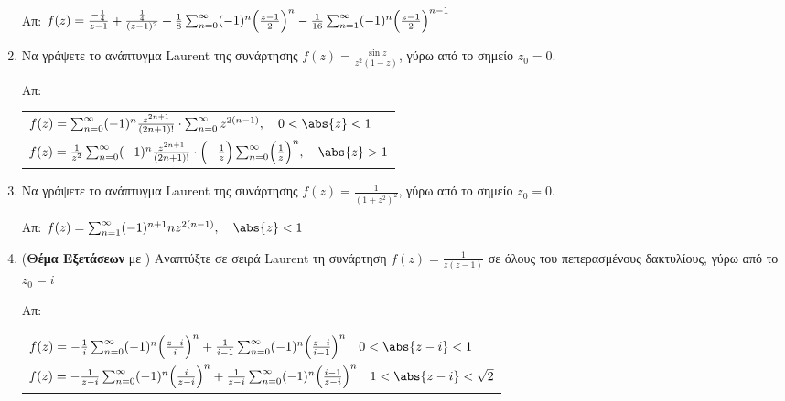 \begin{enumerate}
    \hfill Απ: $f(z)=\frac{-\frac{1}{4}}{z-1}+\frac{\frac{1}{4}}{(z-1)^2}+
    \frac{1}{8}\sum_{n=0}^{\infty}(-1)^n\Bigl(\frac{z-1}{2}\Bigr)^n-
    \frac{1}{16}\sum_{n=1}^{\infty}(-1)^n\Bigl(\frac{z-1}{2}\Bigr)^{n-1}$

  \item Να γράψετε το ανάπτυγμα Laurent της συνάρτησης $f(z)=\frac{\sin z}{z^2(1-z)}$, 
    γύρω από το σημείο $z_0=0$.

    \hfill Απ: 
    \begin{tabular}{l}
      $ f(z)= \sum_{n=0}^{\infty} (-1)^{n} \frac{z^{2n+1}}{(2n+1)!} \cdot
      \sum_{n=0}^{\infty} z^{2(n-1)}, \quad 0 < \abs{z} < 1 $ \\
      $ f(z)= \frac{1}{z^{2}}\sum_{n=0}^{\infty}(-1)^{n} \frac{z^{2n+1}}{(2n+1)!}
      \cdot \Bigl(- \frac{1}{z}\Bigr) \sum_{n=0}^{\infty} \Bigl(\frac{1}{z}\Bigr)^{n}, 
      \quad \abs{z} > 1 $ 
    \end{tabular}

  \item Να γράψετε το ανάπτυγμα Laurent της συνάρτησης $f(z)=\frac{1}{(1+z^2)^2}$, γύρω 
    από το σημείο $z_0=0$.

    \hfill Απ: $ f(z)= \sum_{n=1}^{\infty} (-1)^{n+1}n z^{2(n-1)}, \quad \abs{z}
    < 1 $  

  \item (\textbf{Θέμα Εξετάσεων} με \unboldmath) Αναπτύξτε σε σειρά 
    Laurent τη συνάρτηση $f(z)=\frac{1}{z(z-1)}$ σε όλους του πεπερασμένους δακτυλίους, 
    γύρω από το $z_0=i$

    \hfill Απ: 
    \begin{tabular}{l}
      $ f(z)= - \frac{1}{i} \sum_{n=0}^{\infty} (-1)^{n} \Bigl(\frac{z-i}{i}\Bigr)^{n} + 
      \frac{1}{i-1} \sum_{n=0}^{\infty} (-1)^{n} \Bigl(\frac{z-i}{i-1}\Bigr)^{n} 
      \quad 0 < \abs{z-i} < 1 $ \\
      $ f(z)= - \frac{1}{z-i} \sum_{n=0}^{\infty} (-1)^{n}
      \Bigl(\frac{i}{z-i}\Bigr)^{n} + \frac{1}{z-i} \sum_{n=0}^{\infty} (-1)^{n}
      \Bigl(\frac{i-1}{z-i}\Bigr)^{n} \quad 1 < \abs{z-i} < \sqrt{2} $ \\
    \end{tabular}
\end{enumerate}





